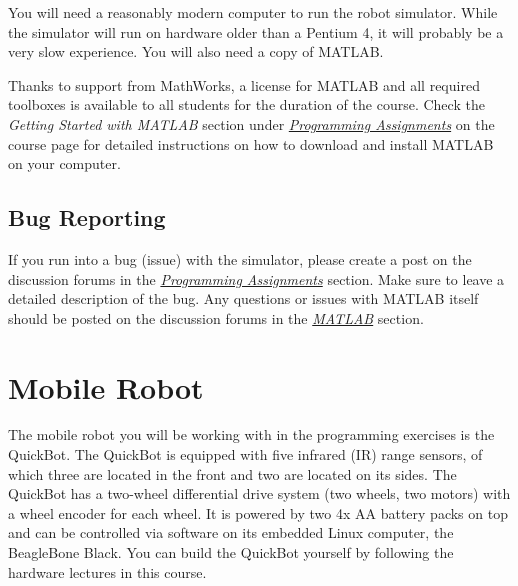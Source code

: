 \documentclass[10pt]{article}
\begin{document}
You will need a reasonably modern computer to run the robot simulator. While the simulator will run on hardware older than a Pentium 4, it will probably be a very slow experience. You will also need a copy of MATLAB. 

Thanks to support from MathWorks, a license for MATLAB and all required toolboxes is available to all students for the duration of the course. Check the \textit{Getting Started with MATLAB} section under \href{https://class.coursera.org/conrob-002/wiki/ProgrammingAssignments}{\textit{Programming Assignments}} on the course page for detailed instructions on how to download and install MATLAB on your computer.

\subsection{Bug Reporting}
If you run into a bug (issue) with the simulator, please create a post on the discussion forums in the \href{https://class.coursera.org/conrob-002/forum/list?forum_id=3}{\textit{Programming Assignments}} section. Make sure to leave a detailed description of the bug. Any questions or issues with MATLAB itself should be posted on the discussion forums in the \href{https://class.coursera.org/conrob-002/forum/list?forum_id=3}{\textit{MATLAB}} section.

\newpage
\section{Mobile Robot}

The mobile robot you will be working with in the programming exercises is the QuickBot. The QuickBot is equipped with five infrared (IR) range sensors, of which three are located in the front and two are located on its sides. The QuickBot has a two-wheel differential drive system (two wheels, two motors) with a wheel encoder for each wheel. It is powered by two 4x AA battery packs on top and can be controlled via software on its embedded Linux computer, the BeagleBone Black. You can build the QuickBot yourself by following the hardware lectures in this course.
\end{document}
